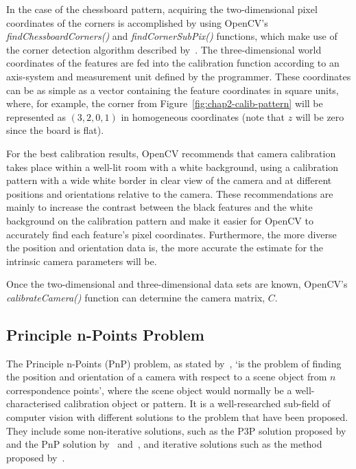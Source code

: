 In the case of the chessboard pattern, acquiring the two-dimensional pixel coordinates of the corners is accomplished by using OpenCV's \emph{findChessboardCorners()} and \emph{findCornerSubPix()} functions, which make use of the corner detection algorithm described by~\cite{harris1988combined}. The three-dimensional world coordinates of the features are fed into the calibration function according to an axis-system and measurement unit defined by the programmer. These coordinates can be as simple as a vector containing the feature coordinates in square units, where, for example, the corner from Figure~\ref{fig:chap2-calib-pattern} will be represented as $(3, 2, 0, 1)$ in homogeneous coordinates (note that $z$ will be zero since the board is flat). 

For the best calibration results, OpenCV recommends that camera calibration takes place within a well-lit room with a white background, using a calibration pattern with a wide white border in clear view of the camera and at different positions and orientations relative to the camera. These recommendations are mainly to increase the contrast between the black features and the white background on the calibration pattern and make it easier for OpenCV to accurately find each feature's pixel coordinates. Furthermore, the more diverse the position and orientation data is, the more accurate the estimate for the intrinsic camera parameters will be. 

Once the two-dimensional and three-dimensional data sets are known, Open\-CV's \emph{calibrateCamera()} function can determine the camera matrix, $C$. 

\subsection{Principle n-Points Problem}

The Principle n-Points (PnP) problem, as stated by~\cite{horaud1989analytic}, `is the problem of finding the position and orientation of a camera with respect to a scene object from $n$ correspondence points', where the scene object would normally be a well-characterised calibration object or pattern. It is a well-researched sub-field of computer vision with different solutions to the problem that have been proposed. They include some non-iterative solutions, such as the P3P solution proposed by~\cite{gao2003complete} and the PnP solution by~\cite{lepetit2009epnp} and~\cite{schweighofer2006robust}, and iterative solutions such as the method proposed by~\cite{lu2000fast}.

